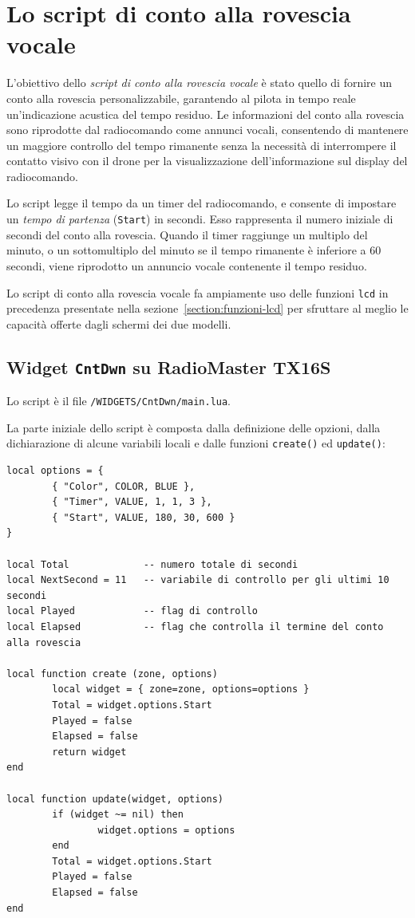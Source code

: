 \documentclass[a4paper, 12pt]{report} %
\begin{document}
\section{Lo script di conto alla rovescia vocale}
L'obiettivo dello \emph{script di conto alla rovescia vocale} è stato quello di fornire un conto alla rovescia personalizzabile, garantendo al pilota in tempo reale un'indicazione acustica del tempo residuo. Le informazioni del conto alla rovescia sono riprodotte dal radiocomando come annunci vocali, consentendo di mantenere un maggiore controllo del tempo rimanente senza la necessità di interrompere il contatto visivo con il drone per la visualizzazione dell'informazione sul display del radiocomando.

Lo script legge il tempo da un timer del radiocomando, e consente di impostare un \emph{tempo di partenza} (\texttt{Start}) in secondi. Esso rappresenta il numero iniziale di secondi del conto alla rovescia. Quando il timer raggiunge un multiplo del minuto, o un sottomultiplo del minuto se il tempo rimanente è inferiore a $60$ secondi, viene riprodotto un annuncio vocale contenente il tempo residuo.

Lo script di conto alla rovescia vocale fa ampiamente uso delle funzioni \texttt{lcd} in precedenza presentate nella sezione~\ref{section:funzioni-lcd} per sfruttare al meglio le capacità offerte dagli schermi dei due modelli.



\subsection{Widget \texttt{CntDwn} su RadioMaster TX16S}

Lo script è il file \texttt{/WIDGETS/CntDwn/main.lua}.

La parte iniziale dello script è composta dalla definizione delle opzioni, dalla dichiarazione di alcune variabili locali e dalle funzioni \texttt{create()} ed \texttt{update()}:

\begin{lstlisting}
local options = {
        { "Color", COLOR, BLUE },
        { "Timer", VALUE, 1, 1, 3 },
        { "Start", VALUE, 180, 30, 600 }
}

local Total             -- numero totale di secondi
local NextSecond = 11   -- variabile di controllo per gli ultimi 10 secondi
local Played            -- flag di controllo
local Elapsed           -- flag che controlla il termine del conto alla rovescia

local function create (zone, options)
        local widget = { zone=zone, options=options }
        Total = widget.options.Start
        Played = false
        Elapsed = false
        return widget
end

local function update(widget, options)
        if (widget ~= nil) then
                widget.options = options
        end
        Total = widget.options.Start
        Played = false
        Elapsed = false
end
\end{lstlisting}
\end{document}
